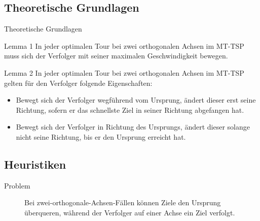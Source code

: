 \documentclass[10pt,table,xcolor=dvipsnames]{beamer}
\begin{document}
\subsection{Theoretische Grundlagen}
\begin{frame}{Theoretische Grundlagen}
\begin{block}{Lemma 1}
In jeder optimalen Tour bei zwei orthogonalen Achsen im MT-TSP muss sich der Verfolger mit seiner  maximalen Geschwindigkeit bewegen.
\end{block}
\begin{block}{Lemma 2}
In jeder optimalen Tour bei zwei orthogonalen Achsen im MT-TSP gelten für den Verfolger folgende Eigenschaften:
\begin{itemize}
\item
Bewegt sich der Verfolger wegführend vom Ursprung, ändert dieser erst seine Richtung, sofern er das schnellste Ziel in seiner Richtung abgefangen hat.
\item
Bewegt sich der Verfolger in Richtung des Ursprungs, ändert dieser solange nicht seine Richtung, bis er den Ursprung erreicht hat.
\end{itemize}
\end{block}
\end{frame}


\subsection{Heuristiken}
\begin{frame}{Problem}
\begin{figure}
\centering
{} \caption{Bei zwei-orthogonale-Achsen-Fällen können Ziele den Ursprung überqueren, während der Verfolger auf einer Achse ein Ziel verfolgt.}
\end{figure}
\end{frame}
\end{document}
